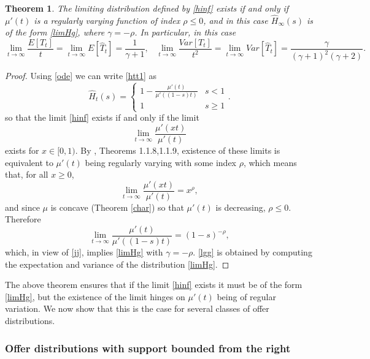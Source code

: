 \documentclass{article}
\newtheorem{thm}{Theorem}[section]
\numberwithin{equation}{section}
\begin{document}
\begin{thm}\label{thmH}
The limiting distribution defined by \eqref{hinf} exists if and only if
$\mu'(t)$ is a regularly varying function of index $\rho\leq 0$, and in this case $\hat{H}_{\infty}(s)$ is of the form \eqref{limHg}, where 
$\gamma=-\rho$. In particular, in this case 
\begin{equation}\label{lgg}\lim_{t\rightarrow \infty}\frac{E[T_t]}{t}=\lim_{t\rightarrow \infty}E[\hat{T}_t]=\frac{1}{\gamma+1},\;\;\;\lim_{t\rightarrow \infty}\frac{Var[T_t]}{t^2}=\lim_{t\rightarrow \infty}Var[\hat{T}_t]=\frac{\gamma}{(\gamma+1)^2(\gamma+2)}.\end{equation}
\end{thm}

\begin{proof}
Using \eqref{ode} we can write \eqref{htt1} as
\begin{equation}\label{jj}\hat{H}_t(s)=
\begin{cases}
	1-\frac{\mu'(t)}{\mu'((1-s)t)} & s<1\\
	1 & s\geq 1
\end{cases}.
\end{equation}
so that the limit \eqref{hinf} exists if and only if the limit 
$$\lim_{t\rightarrow \infty}\frac{\mu'(xt)}{\mu'(t)}$$
exists for $x\in [0,1)$. By \cite{Mladenovic}, Theorems 1.1.8,1.1.9, existence of these limits 
is equivalent to $\mu'(t)$ being regularly varying with some index $\rho$, which means that, for all $x\geq0$,
$$\lim_{t\rightarrow \infty}\frac{\mu'(xt)}{\mu'(t)}=x^\rho,$$
and since $\mu$ is concave (Theorem \ref{char}) so that $\mu'(t)$ is decreasing, $\rho\leq 0$. Therefore
$$\lim_{t\rightarrow \infty}\frac{\mu'(t)}{\mu'((1-s)t)}=(1-s)^{-\rho},$$
which, in view of \eqref{jj}, implies 
\eqref{limHg} with $\gamma=-\rho$.
\eqref{lgg} is obtained by computing the expectation and variance of the 
distribution \eqref{limHg}.
\end{proof}

The above theorem ensures that if the limit \eqref{hinf} exists it must be of the form \eqref{limHg}, but the existence of the limit hinges on  $\mu'(t)$ being of regular variation. 
We now show that this is the case for 
several classes of offer distributions.

\subsubsection{Offer distributions with  support bounded from the right}
\end{document}
